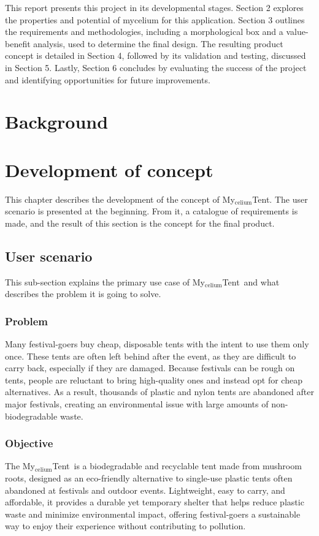 \documentclass{article}
\newcommand{\myc}{My$_{\text{celium}}$Tent}
\begin{document}
This report presents this project in its developmental stages. Section 2 explores the
properties and potential of mycelium for this application. Section 3 outlines the
requirements and methodologies, including a morphological box and a value-benefit
analysis, used to determine the final design. The resulting product concept is detailed in
Section 4, followed by its validation and testing, discussed in Section 5. Lastly,
Section 6 concludes by evaluating the success of the project and identifying opportunities
for future improvements.


\newpage
\section{Background}

\newpage
\section{Development of concept}
This chapter describes the development of the concept of \myc.
The user scenario is presented at the beginning. From it, a catalogue
of requirements is made, and the result of this section is the
concept for the final product.

\subsection{User scenario}
This sub-section explains the primary use case of \myc\ and what describes the
problem it is going to solve. 

\subsubsection{Problem}
Many festival-goers buy cheap, disposable tents with the intent to use them only once.
These tents are often left behind after the event, as they are difficult to carry back,
especially if they are damaged. Because festivals can be rough on tents, people are
reluctant to bring high-quality ones and instead opt for cheap alternatives. As a result,
thousands of plastic and nylon tents are abandoned after major festivals, creating an
environmental issue with large amounts of non-biodegradable waste.

\subsubsection{Objective}
The \myc\ is a biodegradable and recyclable tent made from mushroom roots,
designed as an eco-friendly alternative to single-use plastic tents often abandoned at
festivals and outdoor events. Lightweight, easy to carry, and affordable, it provides a
durable yet temporary shelter that helps reduce plastic waste and minimize
environmental impact, offering festival-goers a sustainable way to enjoy their experience
without contributing to pollution.
\end{document}
